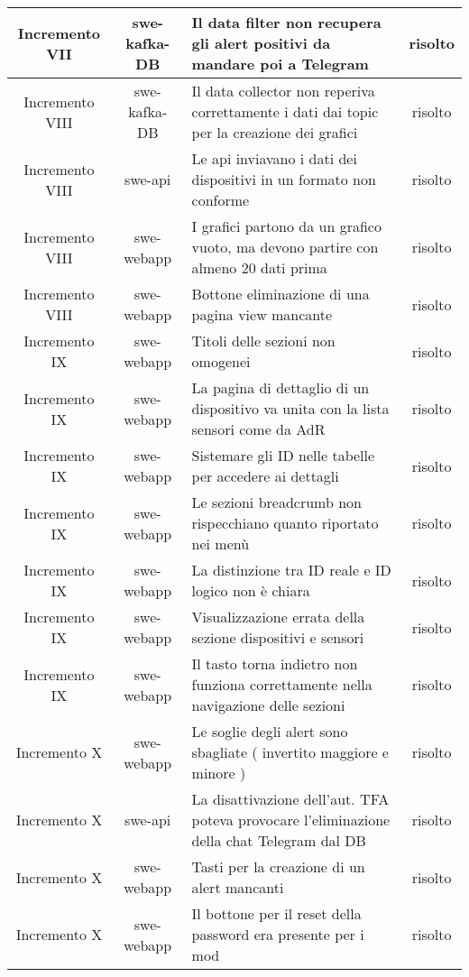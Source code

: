 \begin{center}
\begin{longtable}{|c|c|p{8cm}|c|}
	    Incremento VII & swe-kafka-DB & Il data filter non recupera gli alert positivi da mandare poi a Telegram & risolto \\
	    \hline
	    Incremento VIII & swe-kafka-DB & Il data collector non reperiva correttamente i dati dai topic per la creazione dei grafici & risolto \\
	    \hline
	    Incremento VIII & swe-api & Le api inviavano i dati dei dispositivi in un formato non conforme & risolto \\
	    \hline
	    Incremento VIII & swe-webapp & I grafici partono da un grafico vuoto, ma devono partire con almeno 20 dati prima & risolto \\
	    \hline
	    Incremento VIII & swe-webapp & Bottone eliminazione di una pagina view mancante & risolto \\
	    \hline
	    Incremento IX & swe-webapp & Titoli delle sezioni non omogenei & risolto \\
	    \hline
	    Incremento IX & swe-webapp & La pagina di dettaglio di un dispositivo va unita con la lista sensori come da AdR & risolto \\
	    \hline
	    Incremento IX & swe-webapp & Sistemare gli ID nelle tabelle per accedere ai dettagli & risolto \\
	    \hline
	    Incremento IX & swe-webapp & Le sezioni breadcrumb non rispecchiano quanto riportato nei menù & risolto \\
	    \hline
	    Incremento IX & swe-webapp & La distinzione tra ID reale e ID logico non è chiara & risolto \\
	    \hline
	    Incremento IX & swe-webapp & Visualizzazione errata della sezione dispositivi e sensori & risolto \\
	    \hline
	    Incremento IX & swe-webapp & Il tasto torna indietro non funziona correttamente nella navigazione delle sezioni & risolto \\
	    \hline
	    Incremento X & swe-webapp & Le soglie degli alert sono sbagliate ( invertito maggiore e minore  ) & risolto \\
	    \hline
	    Incremento X & swe-api & La disattivazione dell'aut. TFA poteva provocare l'eliminazione della chat Telegram dal DB & risolto \\
	    \hline
	    Incremento X & swe-webapp & Tasti per la creazione di un alert mancanti & risolto \\
	    \hline
	    Incremento X & swe-webapp & Il bottone per il reset della password era presente per i mod & risolto \\

\end{longtable}
\end{center}
